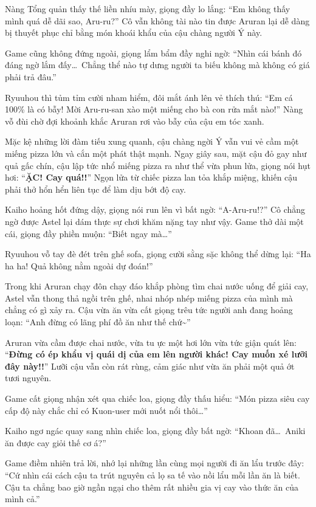 \documentclass[../main.tex]{subfiles}
\begin{document}
Nàng Tổng quản thấy thế liền nhíu mày, giọng đầy lo lắng: ``Em không thấy mình quá dễ dãi sao, Aru-ru?'' Cô vẫn không tài nào tin được Aruran lại dễ dàng bị thuyết phục chỉ bằng món khoái khẩu của cậu chàng người Ý này.

Game cũng không đứng ngoài, giọng lẩm bẩm đầy nghi ngờ: ``Nhìn cái bánh đó đáng ngờ lắm đấy\dots\ Chẳng thể nào tự dưng người ta biếu không mà không có giá phải trả đâu.''

Ryuuhou thì tủm tỉm cười nham hiểm, đôi mắt ánh lên vẻ thích thú: ``Em cá 100\% là có bẫy! Mời Aru-ru-san xào một miếng cho bà con rửa mắt nào!'' Nàng vỗ đùi chờ đợi khoảnh khắc Aruran rơi vào bẫy của cậu em tóc xanh.

Mặc kệ những lời đàm tiếu xung quanh, cậu chàng ngời Ý vẫn vui vẻ cầm một miếng pizza lớn và cắn một phát thật mạnh. Ngay giây sau, mặt cậu đỏ gay như quả gấc chín, cậu lập tức nhổ miếng pizza ra như thể vừa phun lửa, giọng nói hụt hơi: ``\textbf{ẶC! Cay quá!!}'' Ngọn lửa từ chiếc pizza lan tỏa khắp miệng, khiến cậu phải thở hổn hển liên tục để làm dịu bớt độ cay.


Kaiho hoảng hốt đứng dậy, giọng nói run lên vì bất ngờ: ``A-Aru-ru!?'' Cô chẳng ngờ được Astel lại dám thực sự chơi khăm nặng tay như vậy. Game thở dài một cái, giọng đầy phiền muộn: ``Biết ngay mà\dots''

Ryuuhou vỗ tay đè đét trên ghế sofa, giọng cười sằng sặc không thể dừng lại: ``Ha ha ha! Quả không nằm ngoài dự đoán!''

Trong khi Aruran chạy đôn chạy đáo khắp phòng tìm chai nước uống để giải cay, Astel vẫn thong thả ngồi trên ghế, nhai nhóp nhép miếng pizza của mình mà chẳng có gì xảy ra. Cậu vừa ăn vừa cất giọng trêu tức người anh đang hoảng loạn: ``Anh đừng có lãng phí đồ ăn như thế chứ\~{}''

Aruran vừa cầm được chai nước, vừa tu ực một hơi lớn vừa tức giận quát lên: ``\textbf{Đừng có ép khẩu vị quái dị của em lên người khác! Cay muốn xé lưỡi đây này!!}'' Lưỡi cậu vẫn còn rát rùng, cảm giác như vừa ăn phải một quả ớt tươi nguyên.

Game cất giọng nhận xét qua chiếc loa, giọng đầy thấu hiểu: ``Món pizza siêu cay cấp độ này chắc chỉ có Kuon-user mới nuốt nổi thôi\dots''

Kaiho ngơ ngác quay sang nhìn chiếc loa, giọng đầy bất ngờ: ``Khoan đã\dots\ Aniki ăn được cay giỏi thế cơ á?''

Game điềm nhiên trả lời, nhớ lại những lần cùng mọi người đi ăn lẩu trước đây: ``Cứ nhìn cái cách cậu ta trút nguyên cả lọ sa tế vào nồi lẩu mỗi lần ăn là biết. Cậu ta chẳng bao giờ ngần ngại cho thêm rất nhiều gia vị cay vào thức ăn của mình cả.''
\end{document}
